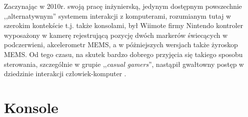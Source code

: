 \label{ch:current_state}

Zaczynając w 2010r. swoją pracę inżynierską, jedynym dostępnym powszechnie ,,alternatywnym'' systemem interakcji z komputerami, rozumianym tutaj w szerokim kontekście \ppauza t.j. także konsolami, był Wiimote firmy Nintendo \ppauza kontroler wyposażony w kamerę rejestrującą pozycję dwóch markerów świecących w podczerwieni, akcelerometr MEMS, a w póżniejszych wersjach także żyroskop MEMS. Od tego czasu, na skutek bardzo dobrego przyjęcia się takiego sposobu sterowania, szczególnie w grupie ,,\textit{casual gamers}'', nastąpił gwałtowny postęp w dziedzinie interakcji człowiek-komputer \cite{hcibook,reachout,movtar,behuman}.\\

\section{Konsole}

